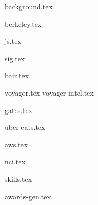 \documentclass[11pt]{article}
\begin{document}
{background.tex}


{berkeley.tex}


{js.tex}

{sig.tex}

{bair.tex}

{voyager.tex}
{voyager-intel.tex}

{gates.tex}

{uber-eats.tex}

{aws.tex}

{nci.tex}



{skills.tex}


{awards-gen.tex}
\end{document}
